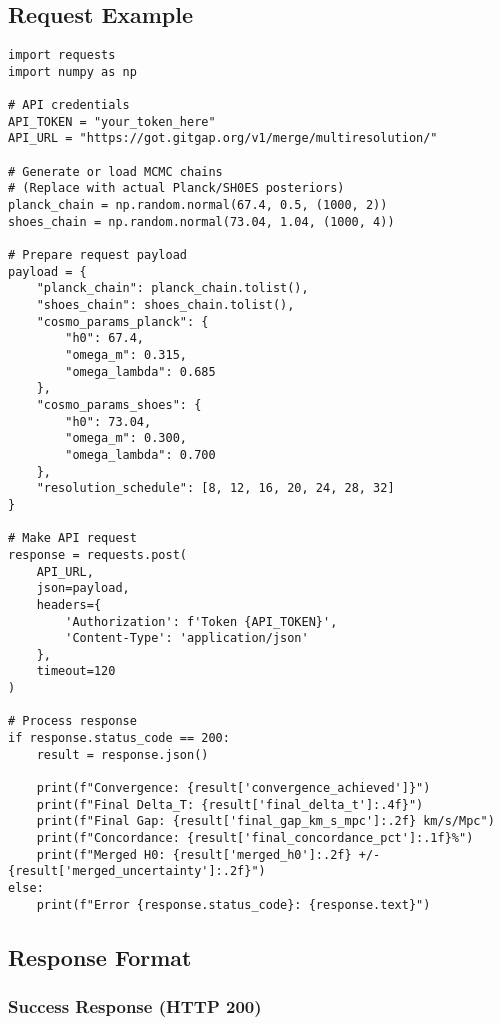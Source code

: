 \documentclass[11pt]{article}
\begin{document}
\subsection{Request Example}

\begin{lstlisting}[style=python, caption={Complete Python example}]
import requests
import numpy as np

# API credentials
API_TOKEN = "your_token_here"
API_URL = "https://got.gitgap.org/v1/merge/multiresolution/"

# Generate or load MCMC chains
# (Replace with actual Planck/SH0ES posteriors)
planck_chain = np.random.normal(67.4, 0.5, (1000, 2))
shoes_chain = np.random.normal(73.04, 1.04, (1000, 4))

# Prepare request payload
payload = {
    "planck_chain": planck_chain.tolist(),
    "shoes_chain": shoes_chain.tolist(),
    "cosmo_params_planck": {
        "h0": 67.4,
        "omega_m": 0.315,
        "omega_lambda": 0.685
    },
    "cosmo_params_shoes": {
        "h0": 73.04,
        "omega_m": 0.300,
        "omega_lambda": 0.700
    },
    "resolution_schedule": [8, 12, 16, 20, 24, 28, 32]
}

# Make API request
response = requests.post(
    API_URL,
    json=payload,
    headers={
        'Authorization': f'Token {API_TOKEN}',
        'Content-Type': 'application/json'
    },
    timeout=120
)

# Process response
if response.status_code == 200:
    result = response.json()

    print(f"Convergence: {result['convergence_achieved']}")
    print(f"Final Delta_T: {result['final_delta_t']:.4f}")
    print(f"Final Gap: {result['final_gap_km_s_mpc']:.2f} km/s/Mpc")
    print(f"Concordance: {result['final_concordance_pct']:.1f}%")
    print(f"Merged H0: {result['merged_h0']:.2f} +/- {result['merged_uncertainty']:.2f}")
else:
    print(f"Error {response.status_code}: {response.text}")
\end{lstlisting}

\subsection{Response Format}

\subsubsection{Success Response (HTTP 200)}
\end{document}
